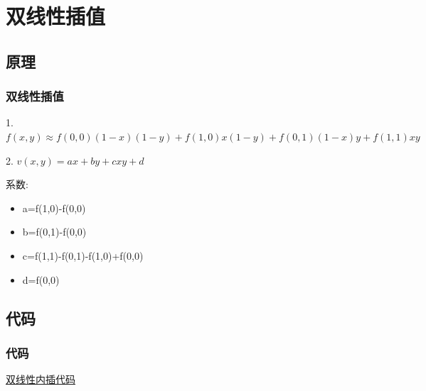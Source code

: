 \documentclass[notheorems,serif,table,compress]{beamer}  %
\begin{document}
\section{双线性插值}

\subsection{原理}
\begin{frame}
\frametitle{双线性插值}

1.$f(x,y) \approx f(0,0)(1-x)(1-y)+f(1,0)x(1-y)+f(0,1)(1-x)y+f(1,1)xy$

\mbox{}

2.
\begin{math}
v(x,y)=ax+by+cxy+d
\end{math}

\mbox{}

系数:
\begin{itemize}
\item a=f(1,0)-f(0,0)
\item b=f(0,1)-f(0,0)
\item c=f(1,1)-f(0,1)-f(1,0)+f(0,0)
\item d=f(0,0)
\end{itemize}
\end{frame}

\subsection{代码}
\begin{frame}
\frametitle{代码}
\href{code/bilinear.cpp}{双线性内插代码}
\end{frame}
\end{document}
